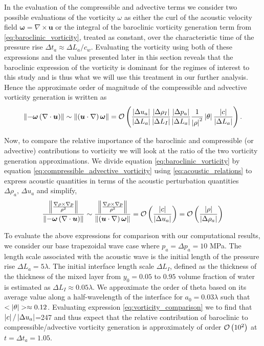 In the evaluation of the compressible and advective terms we consider
two possible evaluations of the vorticity $\omega$ as either the curl
of the acoustic velocity field
$\boldsymbol{\omega}=\nabla\times\boldsymbol{u}$ or the integral of
the baroclinic vorticity generation term from
\eqref{eq:baroclinic_vorticity}, treated as constant, over the
characteristic time of the pressure rise
$\Delta t_a\approx\Delta L_a/c_w$. Evaluating the vorticity using both
of these expressions and the values presented later in this section
reveals that the baroclinic expression of the vorticity is dominant
for the regimes of interest to this study and is thus what we will use
this treatment in our further analysis. Hence the approximate order of magnitude of the compressible and
advective vorticity generation is written as
\begin{align}
  \label{eq:compressible_advective_vorticity}%
  \norm{-\boldsymbol{\omega}\left(\nabla\cdot\boldsymbol{u}\right)}\sim \norm{\left(\boldsymbol{u}\cdot\nabla\right)\boldsymbol{\omega}} = %
  \orderof{%
  \frac{\abs{\Delta u_a}}{\abs{\Delta L_a}} \frac{\abs{\Delta \rho_I}}{\abs{\Delta L_I}}%
  \frac{\abs{\Delta p_a}}{\abs{\Delta L_a}} \frac{1}{\abs{\rho}^2}\abs{\theta}\frac{\abs{c}}{\abs{\Delta L_a}}%
  }.%
\end{align}

Now, to compare the relative importance of the baroclinic and
compressible (or advective) contributions to vorticity we will look at
the ratio of the two vorticity generation approximations. We divide
equation \eqref{eq:baroclinic_vorticity} by equation
\eqref{eq:compressible_advective_vorticity} using
\eqref{eq:acoustic_relations} to express acoustic quantities in terms
of the acoustic perturbation quantities $\Delta \rho_a,\,\Delta u_a$ and simplify,
\begin{align} \label{eq:vorticity_comparison}
  \frac{\norm{\frac{\nabla\rho\times\nabla
  p}{\rho^2}}}{\norm{-\boldsymbol{\omega}\left(\nabla\cdot\boldsymbol{u}\right)}}
  \sim
  \frac{\norm{\frac{\nabla\rho\times\nabla
  p}{\rho^2}}}{\norm{\left(\boldsymbol{u}\cdot\nabla\right)\boldsymbol{\omega}}}
  = \orderof{\frac{\abs{c}}{\abs{\Delta u_a}}} = \orderof{\frac{\abs{\rho}}{\abs{\Delta \rho_a}}}%
\end{align}

To evaluate the above expressions for comparison with our
computational results, we consider our base trapezoidal wave case
where $p_a = \Delta p_a = 10$ MPa. The length scale associated with
the acoustic wave is the initial length of the pressure rise
$\Delta L_a=5\lambda$. The initial interface length scale
$\Delta L_I$, defined as the thickness of the thickness of the mixed
layer from $y_0=0.05$ to $0.95$ volume fraction of water is estimated
as $\Delta L_I \approx 0.05\lambda$. We approximate the order of theta
based on its average value along a half-wavelength of the interface
for $a_0=0.03\lambda$ such that
$<\abs{\theta}>\approx0.12$. Evaluating expression
\eqref{eq:vorticity_comparison} we to find that
$\left|c\right|/\left|\Delta u_a\right|$=247 and thus expect that the relative
contribution of baroclinic to compressible/advective vorticity
generation is approximately of order $\mathcal{O}\left(10^2\right)$ at
$t=\Delta t_a=1.05$.

